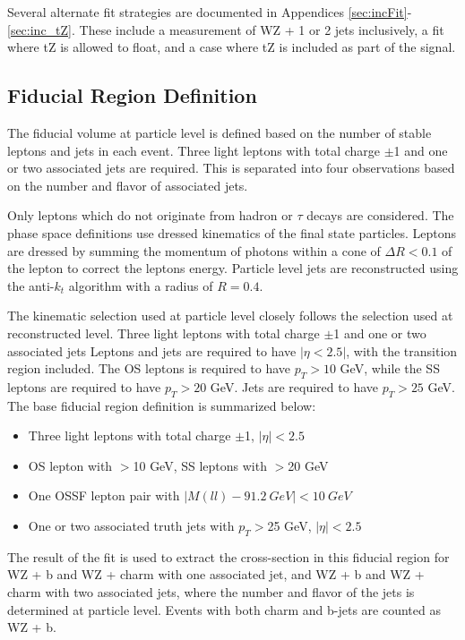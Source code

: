 Several alternate fit strategies are documented in Appendices \ref{sec:incFit}-\ref{sec:inc_tZ}. These include a measurement of WZ + 1 or 2 jets inclusively, a fit where tZ is allowed to float, and a case where tZ is included as part of the signal.

\subsection{Fiducial Region Definition}
\label{sec:fid}

The fiducial volume at particle level is defined based on the number of stable leptons and jets in each event. Three light leptons with total charge $\pm$1 and one or two associated jets are required. This is separated into four observations based on the number and flavor of associated jets.

Only leptons which do not originate from hadron or $\tau$ decays are considered. The phase space definitions use dressed kinematics of the final state particles. Leptons are dressed by summing the momentum of photons within a cone of $\Delta R < 0.1$ of the lepton to correct the leptons energy. Particle level jets are reconstructed using the anti-$k_t$ algorithm with a radius of $R=0.4$. 

The kinematic selection used at particle level closely follows the selection used at reconstructed level. Three light leptons with total charge $\pm$1 and one or two associated jets  Leptons and jets are required to have $|\eta < 2.5|$, with the transition region included. The OS leptons is required to have $p_T > 10$ GeV, while the SS leptons are required to have $p_T > 20$ GeV. Jets are required to have $p_T > 25$ GeV. The base fiducial region definition is summarized below:

\begin{itemize}
\item Three light leptons with total charge $\pm$1, $|\eta| < 2.5$
\item OS lepton with \pt$>$10 GeV, SS leptons with \pt$>$20 GeV
\item One OSSF lepton pair with $|M(ll)-91.2\ GeV| < 10\ GeV$
\item One or two associated truth jets with $p_T >$25 GeV, $|\eta| < 2.5$
\end{itemize}

The result of the fit is used to extract the cross-section in this fiducial region for WZ + b and WZ + charm with one associated jet, and WZ + b and WZ + charm with two associated jets, where the number and flavor of the jets is determined at particle level. Events with both charm and b-jets are counted as WZ + b.

